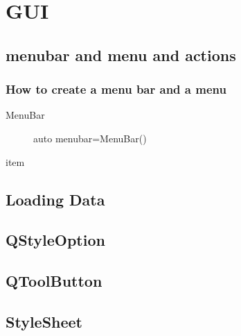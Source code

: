 

\chapter{GUI}

\section{menubar and menu and actions}

\subsection{How to create a menu bar and a menu}

\begin{description}
	\item[MenuBar]  auto menubar=MenuBar()
	\item[item]
\end{description}

\section{Loading Data}


\section{QStyleOption}

\section{QToolButton}
\section{StyleSheet}